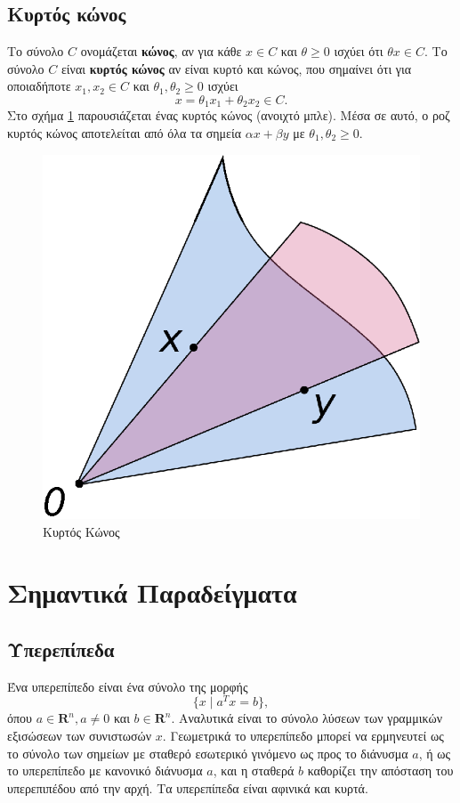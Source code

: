 \subsection{Κυρτός κώνος} Το σύνολο $C$ ονομάζεται \textbf{κώνος}, αν για κάθε $x
\in C$ και $\theta \geq 0$ ισχύει ότι $\theta x \in C$. Το σύνολο $C$ είναι
\textbf{κυρτός κώνος} αν είναι κυρτό και κώνος, που σημαίνει ότι για οποιαδήποτε
$x_1, x_2 \in C$ και $\theta_1, \theta_2 \geq 0$ ισχύει
\begin{equation*}
    x = \theta_1 x_1 + \theta_2 x_2 \in C.
\end{equation*}
Στο σχήμα \ref{fig:convex_cone} παρουσιάζεται ένας κυρτός κώνος (ανοιχτό μπλε).
Μέσα σε αυτό, ο ροζ κυρτός κώνος αποτελείται από όλα τα σημεία
$\alpha x + \beta y$ με $\theta_1, \theta_2 \geq 0$.
\begin{figure}[h]
    \centering
    \includegraphics[scale=0.7]{figures/Convex_cone_illust.eps}
    \caption{Κυρτός Κώνος}
    \label{fig:convex_cone}
\end{figure}

\section{Σημαντικά Παραδείγματα}

\subsection{Υπερεπίπεδα} Ένα υπερεπίπεδο είναι ένα σύνολο της μορφής
\begin{equation*}
    \{ x \mid a^Tx = b \},
\end{equation*}
όπου $a \in \mathbf{R}^n, a \neq 0$ και $b \in \mathbf{R}^n$. Αναλυτικά είναι το
σύνολο λύσεων των γραμμικών εξισώσεων των συνιστωσών $x$. Γεωμετρικά το
υπερεπίπεδο μπορεί να ερμηνευτεί ως το σύνολο των σημείων με σταθερό εσωτερικό
γινόμενο ως προς το διάνυσμα $a$, ή ως το υπερεπίπεδο με κανονικό διάνυσμα
$a$, και η σταθερά $b$ καθορίζει την απόσταση του υπερεπιπέδου από την αρχή. Τα
υπερεπίπεδα είναι αφινικά και κυρτά.

